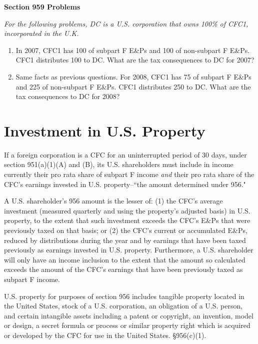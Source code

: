 	\begin{center}
		\textbf{Section 959 Problems}
	\end{center}
	\begin{select}
	\emph{For the following problems, DC is a U.S. corporation that owns 100\% of CFC1, incorporated in the U.K.}
			\begin{enumerate}
				\item In 2007, CFC1 has 100 of subpart F E\&Ps and 100 of non-subpart F E\&Ps.  CFC1 distributes 100 to DC.  What are the tax consequences to DC for 2007?
				\item Same facts as previous questions.  For 2008, CFC1 has 75 of subpart F E\&Ps and 225 of non-subpart F E\&Ps.  CFC1 distributes 250 to DC.  What are the tax consequences to DC for 2008? 
			\end{enumerate}
		\end{select} 	


\section{Investment in U.S. Property}

If a foreign corporation is a CFC for an uninterrupted period of 30 days, under section 951(a)(1)(A) and (B), its U.S. shareholders must include in income currently their pro rata share of subpart F income \emph{and} their pro rata share of the CFC's earnings invested in U.S. property--``the amount determined under 956."  

A U.S. shareholder's 956 amount is the lesser of: (1) the CFC's average investment (measured quarterly and using the property's adjusted basis) in U.S. property, to the extent that such investment exceeds the CFC's E\&Ps that were previously taxed on that basis; or (2) the CFC's current or accumulated E\&Ps, reduced by distributions during the year and by earnings that have been taxed previously as earnings invested in U.S. property.  Furthermore, a U.S. shareholder will only have an income inclusion to the extent that the amount so calculated exceeds the amount of the CFC's earnings that have been previously taxed as subpart F income.

U.S. property for purposes of section 956 includes tangible property located in the United States, stock of a U.S. corporation, an obligation of a U.S. person, and certain intangible assets including a patent or copyright, an invention, model or design, a secret formula or process or similar property right which is acquired or developed by the CFC for use in the United States.  \S956(c)(1).  

